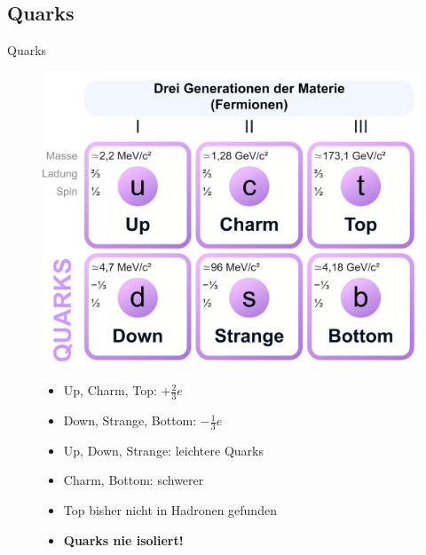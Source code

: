 \documentclass[aspectratio=169]{beamer} %
\begin{document}
    \subsection{Quarks}
    \begin{frame}{Quarks}
      \begin{figure}
        \centering
        \begin{minipage}{0.5\textwidth}
          \centering
          \includegraphics[width=\linewidth, keepaspectratio, height=\textheight]{Standard_Model_of_Elementary_Particles_zoom2.png}\tiny
          \\ \end{minipage}
        \hfill
        \begin{minipage}{0.48\textwidth}
          \begin{itemize}
            \item Up, Charm, Top: $+\frac{2}{3}e$
            \item Down, Strange, Bottom: $-\frac{1}{3}e$
            \item Up, Down, Strange: leichtere Quarks
            \item Charm, Bottom: schwerer
            \item Top bisher nicht in Hadronen gefunden
            \item \textbf{Quarks nie isoliert!}
          \end{itemize}
          \end{minipage}
      \end{figure}
    \end{frame}
\end{document}
